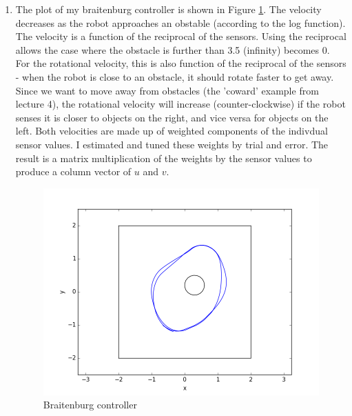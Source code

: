 \documentclass[12pt,a4paper]{article}
\begin{document}
\begin{enumerate}[label=(\alph*)]
        \item The plot of my braitenburg controller is shown in Figure \ref{fig:braitenburg}. The velocity decreases as the robot approaches an obstable (according to the log function). The velocity is a function of the reciprocal of the sensors. Using the reciprocal allows the case where the obstacle is further than 3.5 (infinity) becomes 0. For the rotational velocity, this is also function of the reciprocal of the sensors - when the robot is close to an obstacle, it should rotate faster to get away. Since we want to move away from obstacles (the 'coward' example from lecture 4), the rotational velocity will increase (counter-clockwise) if the robot senses it is closer to objects on the right, and vice versa for objects on the left. Both velocities are made up of weighted components of the indivdual sensor values. I estimated and tuned these weights by trial and error. The result is a matrix multiplication of the weights by the sensor values to produce a column vector of $u$ and $v$.
		\begin{figure}[h]
			\centering
			\includegraphics[width=\textwidth]{fig/2a-1.png}
			\caption{Braitenburg controller}
			\label{fig:braitenburg}
		\end{figure}


\end{enumerate}
\end{document}
